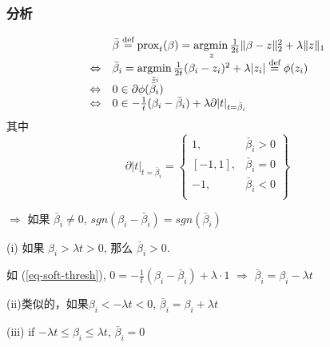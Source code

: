 \documentclass[handout]{beamer}
\begin{document}
\begin{frame}
  \frametitle{分析}
\begin{equation}\label{eq-soft-thresh}
\begin{array}{cl}
& \bar{\beta}\stackrel{\textnormal{def}}{=} \operatorname{prox}_{t}(\beta)
    =\underset{z}{\textnormal{argmin}\,} \frac{1}{2 t}\|\beta-z\|_{2}^{2}+\lambda\|z\|_{1} \\
\Leftrightarrow &   \bar{\beta}_i = \underset{z_i}{\textnormal{argmin}\,} \frac{1}{2 t}(\beta_i-z_i)^{2}+\lambda|z_i|
\stackrel{\textnormal{def}}{=} \phi(z_i) \\
\Leftrightarrow & 0 \in \partial \phi(\bar{\beta}_i) \\
 \Leftrightarrow & 0 \in -\frac{1}{t}(\beta_i - \bar{\beta}_i)
         + \lambda \partial |t|_{t= \bar{\beta}_i} \\
\end{array}
\end{equation}
其中
  $$
\partial |t|_{t= \bar{\beta}_i} =
\left\{
\begin{array}{cl}
           1, & \bar{\beta}_i >0 \\
          \mbox{} [-1,1], & \bar{\beta}_i =0 \\
           -1, & \bar{\beta}_i <0 \\
\end{array}
 \right\}
$$

$\Rightarrow$ 如果 $\bar{\beta}_i \neq 0$, $sgn(\beta_i - \bar{\beta}_i) = sgn (\bar{\beta}_i)$

(i) 如果 $\beta_i >\lambda t>0$,  那么 $\bar{\beta}_i>0$.

如 (\ref{eq-soft-thresh}), $0 = -\frac{1}{t} (\beta_i- \bar{\beta}_i) + \lambda \cdot 1$ $\Rightarrow$
$\bar{\beta}_i = \beta_i -\lambda t$

(ii)类似的，如果$\beta_i <-\lambda t<0 $, $\bar{\beta}_i = \beta_i +\lambda t$

(iii) if $ -\lambda t\leq  \beta_i \leq \lambda t  $, $\bar{\beta}_i =0$
\end{frame}
\end{document}
